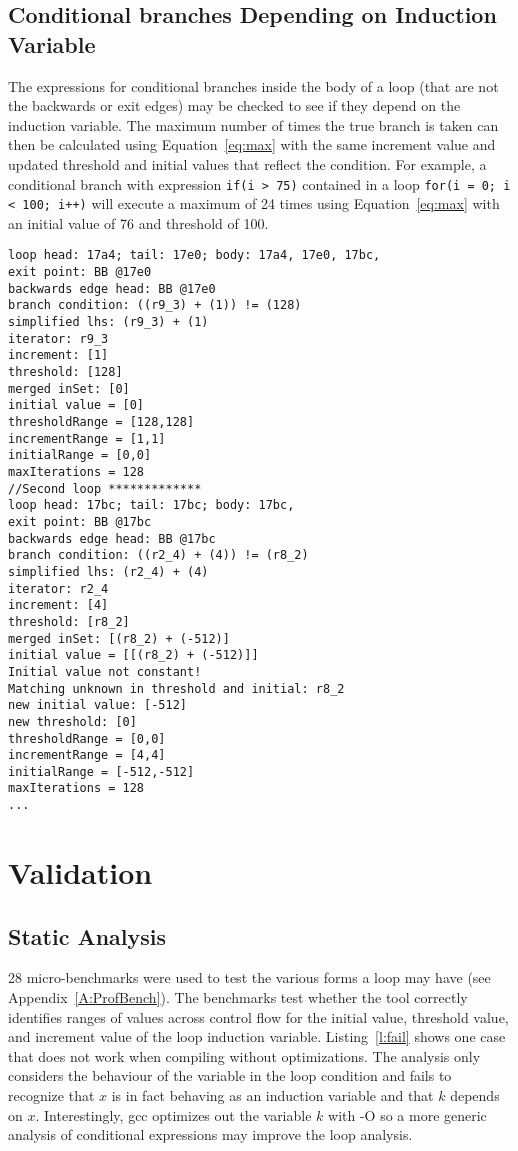 \subsection{Conditional branches Depending on Induction Variable}
	The expressions for conditional branches inside the body of a loop (that are not the backwards or exit edges) may be checked to see if they depend on the induction variable.
	The maximum number of times the true branch is taken can then be calculated using Equation~\ref{eq:max} with the same increment value and updated threshold and initial values that reflect the condition. 
	For example, a conditional branch with expression \texttt{if(i > 75)} contained in a loop \texttt{for(i = 0; i < 100; i++)} will execute a maximum of 24 times using Equation~\ref{eq:max} with an initial value of 76 and threshold of 100.
 
\begin{lstlisting}[caption={Example output for loop analysis on matrix multiplication code.},label={l:matmul-out},captionpos=t]
loop head: 17a4; tail: 17e0; body: 17a4, 17e0, 17bc,
exit point: BB @17e0
backwards edge head: BB @17e0
branch condition: ((r9_3) + (1)) != (128)
simplified lhs: (r9_3) + (1)
iterator: r9_3
increment: [1]
threshold: [128]
merged inSet: [0]
initial value = [0]
thresholdRange = [128,128]
incrementRange = [1,1]
initialRange = [0,0]
maxIterations = 128
//Second loop *************
loop head: 17bc; tail: 17bc; body: 17bc,
exit point: BB @17bc
backwards edge head: BB @17bc
branch condition: ((r2_4) + (4)) != (r8_2)
simplified lhs: (r2_4) + (4)
iterator: r2_4
increment: [4]
threshold: [r8_2]
merged inSet: [(r8_2) + (-512)]
initial value = [[(r8_2) + (-512)]]
Initial value not constant!
Matching unknown in threshold and initial: r8_2
new initial value: [-512]
new threshold: [0]
thresholdRange = [0,0]
incrementRange = [4,4]
initialRange = [-512,-512]
maxIterations = 128
...
\end{lstlisting}




\section{Validation}
\subsection{Static Analysis}
28 micro-benchmarks were used to test the various forms a loop may have (see Appendix~\ref{A:ProfBench}). The benchmarks test whether the tool correctly identifies ranges of values across control flow for the initial value, threshold value, and increment value of the loop induction variable. Listing~\ref{l:fail} shows one case that does not work when compiling without optimizations. The analysis only considers the behaviour of the variable in the loop condition and fails to recognize that $x$ is in fact behaving as an induction variable and that $k$ depends on $x$. Interestingly, gcc optimizes out the variable $k$ with -O so a more generic analysis of conditional expressions may improve the loop analysis.

